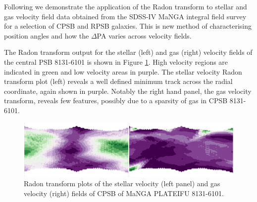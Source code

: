 Following \citet{2018MNRAS.480.2217S} we demonstrate the application of the Radon transform to stellar and gas velocity field data obtained from the SDSS-IV MaNGA integral field survey for a selection of CPSB and RPSB galaxies. This is new method of characterising position angles and how the $\Delta$PA varies across velocity fields. 

The Radon transform output for the stellar (left) and gas (right) velocity fields of the central PSB 8131-6101 is shown in Figure \ref{fig:RT_8131-6101}. High velocity regions are indicated in green and low velocity areas in purple. The stellar velocity Radon transform plot (left) reveals a well defined minimum track across the radial coordinate, again shown in purple. Notably the right hand panel, the gas velocity transform, reveals few features, possibly due to a sparsity of gas in CPSB 8131-6101.

\begin{figure}
    \centering
   	\includegraphics[width=\columnwidth]{images/RadonPlots/RT-snips/CPSB-8313-6101-RT-snip.png}
    \caption{Radon transform plots of the stellar velocity (left panel) and gas velocity (right) fields of CPSB of MaNGA PLATEIFU 8131-6101.}
    \label{fig:RT_8131-6101}
\end{figure}







